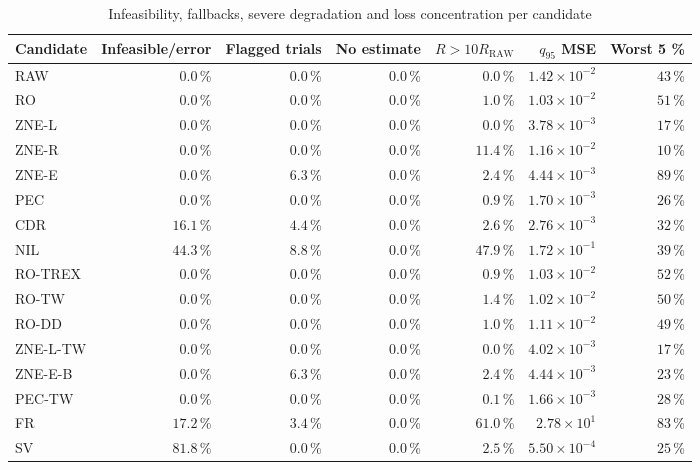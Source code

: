 \begin{table}[p]
\centering
\footnotesize
\setlength{\tabcolsep}{3.0pt}
\caption{Infeasibility, fallbacks, severe degradation and loss concentration per candidate}
\label{tab:qem180-tails}
\begin{tabular}{lrrrrrr}
\toprule
Candidate & Infeasible/error & Flagged trials & No estimate & $R>10R_{\mathrm{RAW}}$ & $q_{95}$ MSE & Worst 5 \% \\
\midrule
RAW & $0.0$\,\% & $0.0$\,\% & $0.0$\,\% & $0.0$\,\% & $1.42\times10^{-2}$ & $43$\,\% \\
RO & $0.0$\,\% & $0.0$\,\% & $0.0$\,\% & $1.0$\,\% & $1.03\times10^{-2}$ & $51$\,\% \\
ZNE-L & $0.0$\,\% & $0.0$\,\% & $0.0$\,\% & $0.0$\,\% & $3.78\times10^{-3}$ & $17$\,\% \\
ZNE-R & $0.0$\,\% & $0.0$\,\% & $0.0$\,\% & $11.4$\,\% & $1.16\times10^{-2}$ & $10$\,\% \\
ZNE-E & $0.0$\,\% & $6.3$\,\% & $0.0$\,\% & $2.4$\,\% & $4.44\times10^{-3}$ & $89$\,\% \\
PEC & $0.0$\,\% & $0.0$\,\% & $0.0$\,\% & $0.9$\,\% & $1.70\times10^{-3}$ & $26$\,\% \\
CDR & $16.1$\,\% & $4.4$\,\% & $0.0$\,\% & $2.6$\,\% & $2.76\times10^{-3}$ & $32$\,\% \\
NIL & $44.3$\,\% & $8.8$\,\% & $0.0$\,\% & $47.9$\,\% & $1.72\times10^{-1}$ & $39$\,\% \\
RO-TREX & $0.0$\,\% & $0.0$\,\% & $0.0$\,\% & $0.9$\,\% & $1.03\times10^{-2}$ & $52$\,\% \\
RO-TW & $0.0$\,\% & $0.0$\,\% & $0.0$\,\% & $1.4$\,\% & $1.02\times10^{-2}$ & $50$\,\% \\
RO-DD & $0.0$\,\% & $0.0$\,\% & $0.0$\,\% & $1.0$\,\% & $1.11\times10^{-2}$ & $49$\,\% \\
ZNE-L-TW & $0.0$\,\% & $0.0$\,\% & $0.0$\,\% & $0.0$\,\% & $4.02\times10^{-3}$ & $17$\,\% \\
ZNE-E-B & $0.0$\,\% & $6.3$\,\% & $0.0$\,\% & $2.4$\,\% & $4.44\times10^{-3}$ & $23$\,\% \\
PEC-TW & $0.0$\,\% & $0.0$\,\% & $0.0$\,\% & $0.1$\,\% & $1.66\times10^{-3}$ & $28$\,\% \\
FR & $17.2$\,\% & $3.4$\,\% & $0.0$\,\% & $61.0$\,\% & $2.78\times10^{1}$ & $83$\,\% \\
SV & $81.8$\,\% & $0.0$\,\% & $0.0$\,\% & $2.5$\,\% & $5.50\times10^{-4}$ & $25$\,\% \\

\end{tabular}
\end{table}
